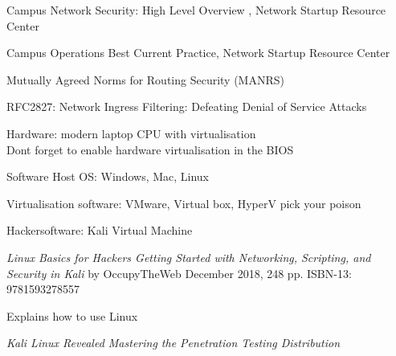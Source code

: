 \documentclass[Screen16to9,17pt]{foils}
\begin{document}
\begin{list2}
\item Campus Network Security: High Level Overview , Network Startup Resource Center

\item Campus Operations Best Current Practice, Network Startup Resource Center

\item Mutually Agreed Norms for Routing Security (MANRS)

\item RFC2827: Network Ingress Filtering: Defeating Denial of Service Attacks
\end{list2}



\begin{list2}
\item Hardware: modern laptop CPU with virtualisation\\
Dont forget to enable hardware virtualisation in the BIOS
\item Software Host OS: Windows, Mac, Linux
\item Virtualisation software: VMware, Virtual box, HyperV pick your poison
\item Hackersoftware: Kali Virtual Machine 
\end{list2}




\emph{Linux Basics for Hackers
Getting Started with Networking, Scripting, and Security in Kali}
by OccupyTheWeb
December 2018, 248 pp.
ISBN-13:
9781593278557

Explains how to use Linux



\emph{Kali Linux Revealed  Mastering the Penetration Testing Distribution}
\end{document}
